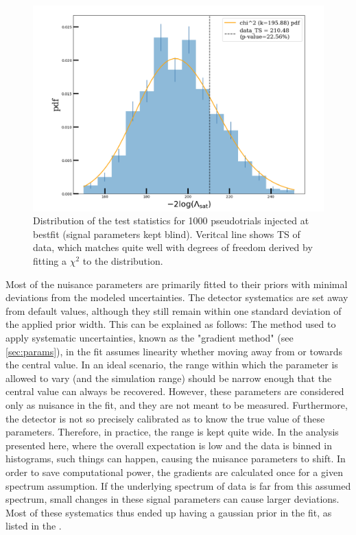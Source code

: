 \begin{figure}[ht]
	\includegraphics[scale=0.5]{./figures/results/GOF.pdf}
	\caption{Distribution of the test statistics for 1000 pseudotrials injected at bestfit (signal parameters kept blind). Veritcal line shows TS of data, which matches quite well with degrees of freedom derived by fitting a $\chi^2$ to the distribution.}
\end{figure}

Most of the nuisance parameters are primarily fitted to their priors with minimal deviations from the modeled uncertainties. The detector systematics are set away from default values, although they still remain within one standard deviation of the applied prior width. This can be explained as follows: The method used to apply systematic uncertainties, known as the "gradient method" (see \ref{sec:params}), in the fit assumes linearity whether moving away from or towards the central value. In an ideal scenario, the range within which the parameter is allowed to vary (and the simulation range) should be narrow enough that the central value can always be recovered. However, these parameters are considered only as nuisance in the fit, and they are not meant to be measured. Furthermore, the detector is not so precisely calibrated as to know the true value of these parameters. Therefore, in practice, the range is kept quite wide. In the analysis presented here, where the overall expectation is low and the data is binned in histograms, such things can happen, causing the nuisance parameters to shift.  In order to save computational power, the gradients are calculated once for a given spectrum assumption. If the underlying spectrum of data is far from this assumed spectrum, small changes in these signal parameters can cause larger deviations. Most of these systematics thus ended up having a gaussian prior in the fit, as listed in the . 
 

